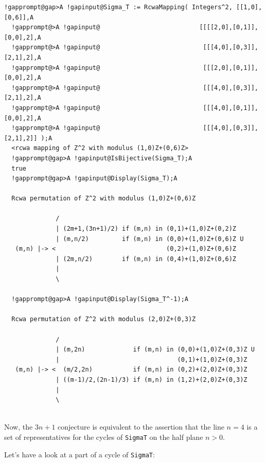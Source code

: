 \documentclass[a4paper,11pt]{report}
\begin{document}
{{\begin{Verbatim}[commandchars=!@A,fontsize=\small,frame=single,label=Example]
  !gapprompt@gap>A !gapinput@Sigma_T := RcwaMapping( Integers^2, [[1,0],[0,6]],A
  !gapprompt@>A !gapinput@                           [[[[2,0],[0,1]],[0,0],2],A
  !gapprompt@>A !gapinput@                            [[[4,0],[0,3]],[2,1],2],A
  !gapprompt@>A !gapinput@                            [[[2,0],[0,1]],[0,0],2],A
  !gapprompt@>A !gapinput@                            [[[4,0],[0,3]],[2,1],2],A
  !gapprompt@>A !gapinput@                            [[[4,0],[0,1]],[0,0],2],A
  !gapprompt@>A !gapinput@                            [[[4,0],[0,3]],[2,1],2]] );A
  <rcwa mapping of Z^2 with modulus (1,0)Z+(0,6)Z>
  !gapprompt@gap>A !gapinput@IsBijective(Sigma_T);A
  true
  !gapprompt@gap>A !gapinput@Display(Sigma_T);A
  
  Rcwa permutation of Z^2 with modulus (1,0)Z+(0,6)Z
  
              /
              | (2m+1,(3n+1)/2) if (m,n) in (0,1)+(1,0)Z+(0,2)Z
              | (m,n/2)         if (m,n) in (0,0)+(1,0)Z+(0,6)Z U 
   (m,n) |-> <                              (0,2)+(1,0)Z+(0,6)Z
              | (2m,n/2)        if (m,n) in (0,4)+(1,0)Z+(0,6)Z
              |
              \
  
  !gapprompt@gap>A !gapinput@Display(Sigma_T^-1);A
  
  Rcwa permutation of Z^2 with modulus (2,0)Z+(0,3)Z
  
              /
              | (m,2n)             if (m,n) in (0,0)+(1,0)Z+(0,3)Z U 
              |                                (0,1)+(1,0)Z+(0,3)Z
   (m,n) |-> <  (m/2,2n)           if (m,n) in (0,2)+(2,0)Z+(0,3)Z
              | ((m-1)/2,(2n-1)/3) if (m,n) in (1,2)+(2,0)Z+(0,3)Z
              |
              \
  
\end{Verbatim}
 Now, the $3n+1$ conjecture is equivalent to the assertion that the line $n=4$ is a set of representatives for the cycles of \texttt{Sigma{\textunderscore}T} on the half plane $n > 0$. 

 Let's have a look at a part of a cycle of \texttt{Sigma{\textunderscore}T}: 
\begin{Verbatim}[commandchars=!@|,fontsize=\small,frame=single,label=Example]
  

\end{Verbatim}}}
\end{document}
